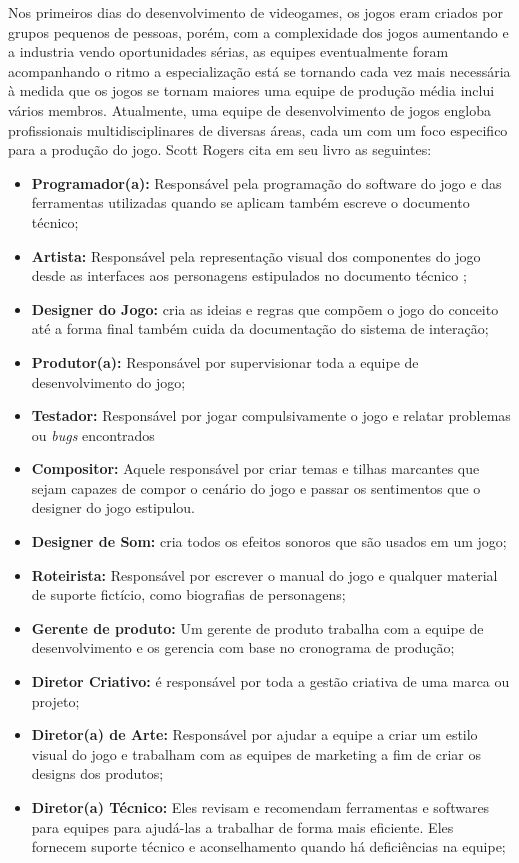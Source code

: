Nos primeiros dias do desenvolvimento de videogames, os jogos eram criados por grupos pequenos de pessoas, porém, com a complexidade dos jogos aumentando e a industria vendo oportunidades sérias, as equipes eventualmente foram acompanhando o ritmo a especialização está se tornando cada vez mais necessária à medida que os jogos se tornam maiores uma equipe de produção média inclui vários membros. Atualmente, uma equipe de desenvolvimento de jogos engloba profissionais multidisciplinares de diversas áreas, cada um com um foco especifico para a produção do jogo. Scott Rogers cita em seu livro \cite{GameDesign} as seguintes: 
\begin{itemize}
    \item \textbf{Programador(a):} Responsável pela programação do software do jogo e das ferramentas utilizadas quando se aplicam também escreve o documento técnico;
    \item \textbf{Artista:} Responsável pela representação visual dos componentes do jogo desde as interfaces aos personagens estipulados no documento técnico ;
    \item \textbf{Designer do Jogo:} cria as ideias e regras que compõem o jogo do conceito até a forma final também cuida da documentação do sistema de interação;
    \item \textbf{Produtor(a): }Responsável por supervisionar toda a equipe de desenvolvimento do jogo;
    \item \textbf{Testador:} Responsável por jogar compulsivamente o jogo e relatar problemas ou \textit{bugs} encontrados
    \item \textbf{Compositor:} Aquele responsável por criar temas e tilhas marcantes que sejam capazes de compor o cenário do jogo e passar os sentimentos que o designer do jogo estipulou.
    \item \textbf{Designer de Som:} cria todos os efeitos sonoros que são usados em um jogo;
    \item \textbf{Roteirista:}  Responsável por escrever o manual do jogo e qualquer material de suporte fictício, como  biografias de personagens;
    \item \textbf{Gerente de produto:} Um gerente de produto trabalha com a equipe de desenvolvimento e os gerencia com base no cronograma de produção;
    \item \textbf{Diretor Criativo:} é responsável por toda a gestão criativa de uma marca ou projeto;
    \item \textbf{Diretor(a) de Arte:} Responsável por ajudar a equipe a criar um estilo visual do jogo e trabalham com as equipes de marketing a fim de criar os designs dos produtos;
    \item \textbf{Diretor(a) Técnico:} Eles revisam e recomendam ferramentas e softwares para equipes para ajudá-las a trabalhar de forma mais eficiente. Eles fornecem suporte técnico e aconselhamento quando há deficiências na equipe;
\end{itemize}

